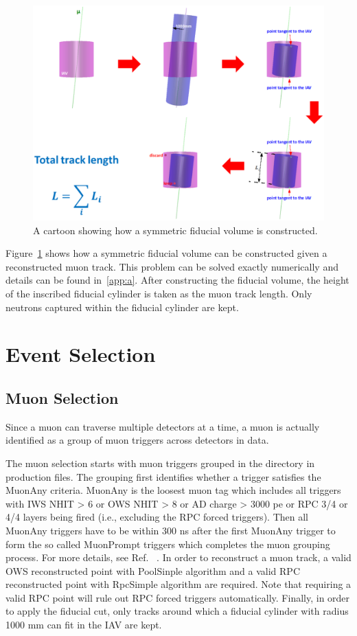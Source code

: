 \documentclass[paper=a4, fontsize=12pt, toc=left]{scrartcl} %
\numberwithin{equation}{section} %
\numberwithin{figure}{section} %
\numberwithin{table}{section} %
\begin{document}
\begin{figure}[h]
	\centering
	\includegraphics[width=\textwidth]{figures/fiducial_illustration.eps}
	\caption{A cartoon showing how a symmetric fiducial volume is constructed.}
	\label{fig:fiducial_illustration}
\end{figure}
Figure~\ref{fig:fiducial_illustration} shows how a symmetric fiducial volume can be constructed given a reconstructed muon track. This problem can be solved exactly numerically and details can be found in~\ref{app:a}. After constructing the fiducial volume, the height of the inscribed fiducial cylinder is taken as the muon track length. Only neutrons captured within the fiducial cylinder are kept.


\section{Event Selection}

\subsection{Muon Selection}

Since a muon can traverse multiple detectors at a time, a muon is actually identified as a group of muon triggers across detectors in data.

The muon selection starts with muon triggers grouped in the directory \scriptsize{} \normalsize in production files. The grouping first identifies whether a trigger satisfies the MuonAny criteria. MuonAny is the loosest muon tag which includes all triggers with IWS NHIT > 6 or OWS NHIT > 8 or AD charge > 3000 pe or RPC 3/4 or 4/4 layers being fired (i.e., excluding the RPC forced triggers). Then all MuonAny triggers have to be within 300 ns after the first MuonAny trigger to form the so called MuonPrompt triggers which completes the muon grouping process. For more details, see Ref.~\cite{docdb6759} . In order to reconstruct a muon track, a valid OWS reconstructed point with PoolSinple algorithm and a valid RPC reconstructed point with RpcSimple algorithm are required. Note that requiring a valid RPC point will rule out RPC forced triggers automatically. Finally, in order to apply the fiducial cut, only tracks around which a fiducial cylinder with radius 1000 mm can fit in the IAV are kept.
\end{document}
